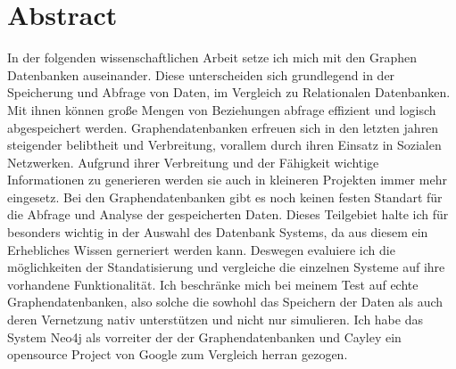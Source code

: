 \pagestyle{empty} %


\chapter*{Abstract} %
\label{cha:abtract}
	In der folgenden wissenschaftlichen Arbeit setze ich mich mit den Graphen Datenbanken auseinander.
	Diese unterscheiden sich grundlegend in der Speicherung und Abfrage von Daten, im Vergleich zu Relationalen Datenbanken.
	Mit ihnen können große Mengen von Beziehungen abfrage effizient und logisch abgespeichert werden.
	Graphendatenbanken erfreuen sich in den letzten jahren steigender belibtheit und Verbreitung, vorallem durch ihren Einsatz in Sozialen Netzwerken.
	Aufgrund ihrer Verbreitung und der Fähigkeit wichtige Informationen zu generieren werden sie auch in kleineren Projekten immer mehr eingesetz.
	Bei den Graphendatenbanken gibt es noch keinen festen Standart für die Abfrage und Analyse der gespeicherten Daten.
	Dieses Teilgebiet halte ich für besonders wichtig in der Auswahl des Datenbank Systems, da aus diesem ein Erhebliches Wissen gerneriert werden kann. 
	Deswegen evaluiere ich die möglichkeiten der Standatisierung und vergleiche die einzelnen Systeme auf ihre vorhandene Funktionalität.
	Ich beschränke mich bei meinem Test auf echte Graphendatenbanken, also solche die sowhohl das Speichern der Daten als auch deren Vernetzung nativ unterstützen und nicht nur simulieren.
	Ich habe das System Neo4j als vorreiter der der Graphendatenbanken und Cayley ein opensource Project von Google zum Vergleich herran gezogen.
	
	
\nocite{Robinson2015}